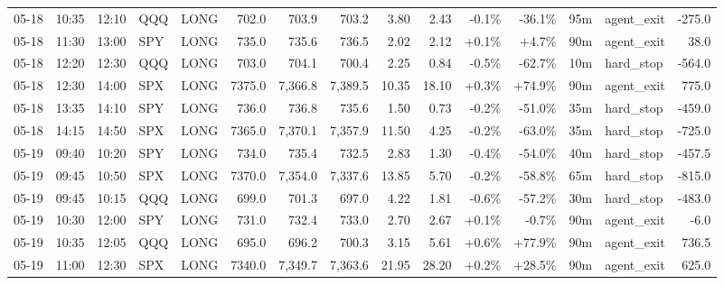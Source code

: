 \documentclass[11pt,a4paper,twoside]{article}
\begin{document}
\begin{landscape}
\begin{center}
\begin{longtable}{>{\color{txtmain}}l l l l l r r r r r r r r >{\color{txtmain}}l r}
05-18 & 10:35 & 12:10 & QQQ & LONG & 702.0 & 703.9 & 703.2 & 3.80 & 2.43 & \textcolor{lossred}{-0.1\%} & \textcolor{lossred}{-36.1\%} & 95m & agent\_exit & \textcolor{lossred}{-275.0} \\
05-18 & 11:30 & 13:00 & SPY & LONG & 735.0 & 735.6 & 736.5 & 2.02 & 2.12 & \textcolor{wingreen}{+0.1\%} & \textcolor{wingreen}{+4.7\%} & 90m & agent\_exit & \textcolor{wingreen}{38.0} \\
05-18 & 12:20 & 12:30 & QQQ & LONG & 703.0 & 704.1 & 700.4 & 2.25 & 0.84 & \textcolor{lossred}{-0.5\%} & \textcolor{lossred}{-62.7\%} & 10m & hard\_stop & \textcolor{lossred}{-564.0} \\
05-18 & 12:30 & 14:00 & SPX & LONG & 7375.0 & 7,366.8 & 7,389.5 & 10.35 & 18.10 & \textcolor{wingreen}{+0.3\%} & \textcolor{wingreen}{+74.9\%} & 90m & agent\_exit & \textcolor{wingreen}{775.0} \\
05-18 & 13:35 & 14:10 & SPY & LONG & 736.0 & 736.8 & 735.6 & 1.50 & 0.73 & \textcolor{lossred}{-0.2\%} & \textcolor{lossred}{-51.0\%} & 35m & hard\_stop & \textcolor{lossred}{-459.0} \\
05-18 & 14:15 & 14:50 & SPX & LONG & 7365.0 & 7,370.1 & 7,357.9 & 11.50 & 4.25 & \textcolor{lossred}{-0.2\%} & \textcolor{lossred}{-63.0\%} & 35m & hard\_stop & \textcolor{lossred}{-725.0} \\
05-19 & 09:40 & 10:20 & SPY & LONG & 734.0 & 735.4 & 732.5 & 2.83 & 1.30 & \textcolor{lossred}{-0.4\%} & \textcolor{lossred}{-54.0\%} & 40m & hard\_stop & \textcolor{lossred}{-457.5} \\
05-19 & 09:45 & 10:50 & SPX & LONG & 7370.0 & 7,354.0 & 7,337.6 & 13.85 & 5.70 & \textcolor{lossred}{-0.2\%} & \textcolor{lossred}{-58.8\%} & 65m & hard\_stop & \textcolor{lossred}{-815.0} \\
05-19 & 09:45 & 10:15 & QQQ & LONG & 699.0 & 701.3 & 697.0 & 4.22 & 1.81 & \textcolor{lossred}{-0.6\%} & \textcolor{lossred}{-57.2\%} & 30m & hard\_stop & \textcolor{lossred}{-483.0} \\
05-19 & 10:30 & 12:00 & SPY & LONG & 731.0 & 732.4 & 733.0 & 2.70 & 2.67 & \textcolor{wingreen}{+0.1\%} & \textcolor{lossred}{-0.7\%} & 90m & agent\_exit & \textcolor{lossred}{-6.0} \\
05-19 & 10:35 & 12:05 & QQQ & LONG & 695.0 & 696.2 & 700.3 & 3.15 & 5.61 & \textcolor{wingreen}{+0.6\%} & \textcolor{wingreen}{+77.9\%} & 90m & agent\_exit & \textcolor{wingreen}{736.5} \\
05-19 & 11:00 & 12:30 & SPX & LONG & 7340.0 & 7,349.7 & 7,363.6 & 21.95 & 28.20 & \textcolor{wingreen}{+0.2\%} & \textcolor{wingreen}{+28.5\%} & 90m & agent\_exit & \textcolor{wingreen}{625.0} \\

\end{longtable}
\end{center}
\end{landscape}
\end{document}
